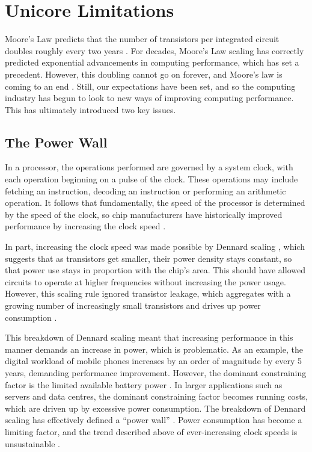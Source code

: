 \documentclass[bsc,frontabs,singlespacing,parskip,deptreport]{infthesis}
\begin{document}
\section{Unicore Limitations} \label{unicore-limitations}
Moore’s Law predicts that the number of transistors per integrated circuit doubles roughly every two years \cite{moore_1998} \cite{moore_2006}. For decades, Moore’s Law scaling has correctly predicted exponential advancements in computing performance, which has set a precedent. However, this doubling cannot go on forever, and Moore’s law is coming to an end \cite{DBLP:journals/cse/TheisW17}. Still, our expectations have been set, and so the computing industry has begun to look to new ways of improving computing performance. This has ultimately introduced two key issues.

\subsection{The Power Wall} \label{the-power-wall}
In a processor, the operations performed are governed by a system clock, with each operation beginning on a pulse of the clock. These operations may include fetching an instruction, decoding an instruction or performing an arithmetic operation. It follows that fundamentally, the speed of the processor is determined by the speed of the clock, so chip manufacturers have historically improved performance by increasing the clock speed \cite{stallings}.

In part, increasing the clock speed was made possible by Dennard scaling \cite{dennard_1999}, which suggests that as transistors get smaller, their power density stays constant, so that power use stays in proportion with the chip's area. This should have allowed circuits to operate at higher frequencies without increasing the power usage. However, this scaling rule ignored transistor leakage, which aggregates with a growing number of increasingly small transistors and drives up power consumption \cite{bohr_2007}.

This breakdown of Dennard scaling meant that increasing performance in this manner demands an increase in power, which is problematic. As an example, the digital workload of mobile phones increases by an order of magnitude by every 5 years, demanding performance improvement. However, the dominant constraining factor is the limited available battery power \cite{berkel_2009}. In larger applications such as servers and data centres, the dominant constraining factor becomes running costs, which are driven up by excessive power consumption. The breakdown of Dennard scaling has effectively defined a “power wall” \cite{patterson-hennessy}. Power consumption has become a limiting factor, and the trend described above of ever-increasing clock speeds is unsustainable \cite{blake_2009}.
\end{document}
